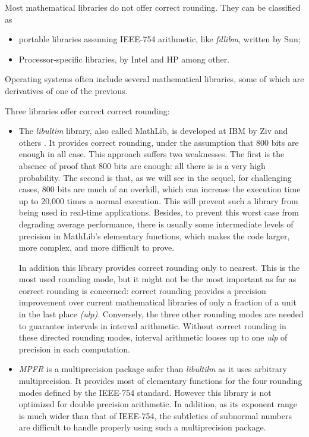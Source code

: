 Most mathematical libraries do not offer correct rounding. They can be classified as 
\begin{itemize}
\item portable libraries  assuming IEEE-754
  arithmetic, like \emph{fdlibm}, written by Sun\cite{FDLIBMweb};
\item  Processor-specific libraries, by
  Intel\cite{HarKubStoTan99,IntelOpenSource} and
  HP\cite{Markstein2000,Markstein2001} among other.
\end{itemize}

Operating systems often include several mathematical libraries, some of which are derivatives of one
of the previous.

Three libraries offer correct correct rounding:
\begin{itemize}
\item The \emph{libultim} library, also called MathLib, is developed at
  IBM by Ziv and others \cite{IBMlibultimweb}. It provides correct rounding,
  under the assumption that 800 bits are enough in all case. This
  approach suffers two weaknesses. The first is the absence of proof
  that 800 bits are enough: all there is is a very high probability.
  The second is that, as we will see in the sequel, for challenging
  cases, 800 bits are much of an overkill, which can increase the
  execution time up to 20,000 times a normal execution. This will
  prevent such a library from being used in real-time applications.
  Besides, to prevent this worst case from degrading average
  performance, there is usually some intermediate levels of precision
  in MathLib's elementary functions, which makes the code larger, more
  complex, and more difficult to prove.
  
  In addition this library provides correct rounding only to nearest.
  This is the most used rounding mode, but it might not be the most
  important as far as correct rounding is concerned: correct rounding
  provides a precision improvement over current mathematical libraries
  of only a fraction of a {unit in the last place} \emph{(ulp)}.
  Conversely, the three other rounding modes are needed to guarantee
  intervals in interval arithmetic.  Without correct rounding in these
  directed rounding modes, interval arithmetic looses up to one
  \emph{ulp} of precision in each computation.
  
\item \emph{MPFR} is a multiprecision package safer than
  \emph{libultilm} as it uses arbitrary multiprecision. It provides
  most of elementary functions for the four rounding modes defined by
  the IEEE-754 standard. However this library is not optimized for
  double precision arithmetic. In addition, as its exponent range is
  much wider than that of IEEE-754, the subtleties of subnormal numbers
  are difficult to handle properly using such a multiprecision
  package.


\end{itemize}
